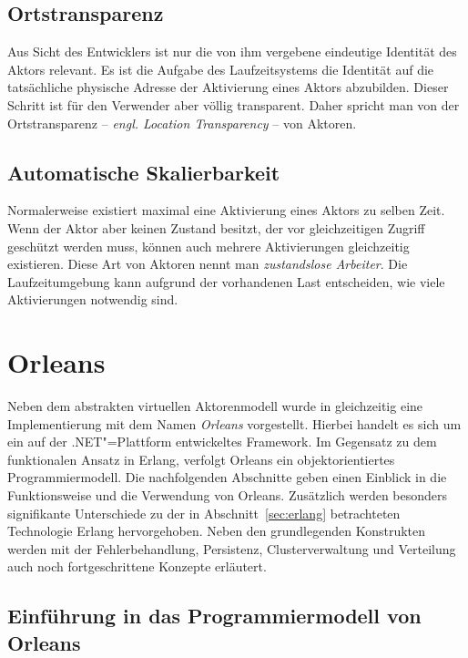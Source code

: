 \subsection{Ortstransparenz}

Aus Sicht des Entwicklers ist nur die von ihm vergebene eindeutige Identität des Aktors relevant. Es ist die Aufgabe des Laufzeitsystems die Identität auf die tatsächliche physische Adresse der Aktivierung eines Aktors abzubilden. Dieser Schritt ist für den Verwender aber völlig transparent. Daher spricht man von der Ortstransparenz -- \textit{engl. Location Transparency} -- von Aktoren.

\subsection{Automatische Skalierbarkeit}

Normalerweise existiert maximal eine Aktivierung eines Aktors zu selben Zeit. Wenn der Aktor aber keinen Zustand besitzt, der vor gleichzeitigen Zugriff geschützt werden muss, können auch mehrere Aktivierungen gleichzeitig existieren. Diese Art von Aktoren nennt man \textsl{zustandslose Arbeiter}. Die Laufzeitumgebung kann aufgrund der vorhandenen Last entscheiden, wie viele Aktivierungen notwendig sind.

\section{Orleans}

Neben dem abstrakten virtuellen Aktorenmodell wurde in \cite{virtualActors} gleichzeitig eine Implementierung mit dem Namen \textit{Orleans} vorgestellt. Hierbei handelt es sich um ein auf der .NET"=Plattform entwickeltes Framework. Im Gegensatz zu dem funktionalen Ansatz in Erlang, verfolgt Orleans ein objektorientiertes Programmiermodell. Die nachfolgenden Abschnitte geben einen Einblick in die Funktionsweise und die Verwendung von Orleans. Zusätzlich werden besonders signifikante Unterschiede zu der in Abschnitt~\ref{sec:erlang} betrachteten Technologie Erlang hervorgehoben. Neben den grundlegenden Konstrukten werden mit der Fehlerbehandlung, Persistenz, Clusterverwaltung und Verteilung auch noch fortgeschrittene Konzepte erläutert.

\subsection{Einführung in das Programmiermodell von Orleans}

